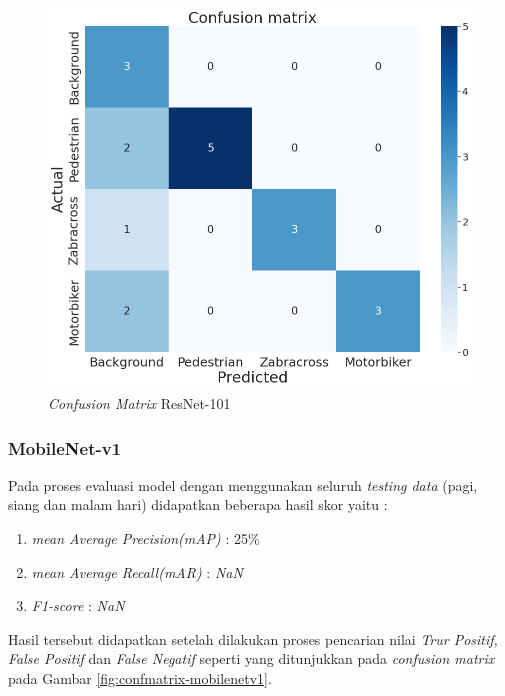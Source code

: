 \begin{figure}[!h]
	\centering
	\includegraphics[scale=0.3]{gambar/confmatrix/all-resnet101-blue.png}
	\caption{\textit{Confusion Matrix} ResNet-101}
	\label{fig:confmatrix-resnet101}
\end{figure}

\subsubsection{MobileNet-v1}

Pada proses evaluasi model dengan menggunakan seluruh \textit{testing data} (pagi, siang dan malam hari) didapatkan beberapa hasil skor yaitu :
\begin{enumerate}[nolistsep]
	\item \textit{mean Average Precision(mAP)} : 25\%
	\item \textit{mean Average Recall(mAR)} : \textit{NaN}
	\item \textit{F1-score} : \textit{NaN}
\end{enumerate}
Hasil tersebut didapatkan setelah dilakukan proses pencarian nilai \textit{Trur Positif, False Positif} dan \textit{False Negatif} seperti yang ditunjukkan pada \textit{confusion matrix} pada Gambar \ref{fig:confmatrix-mobilenetv1}.

